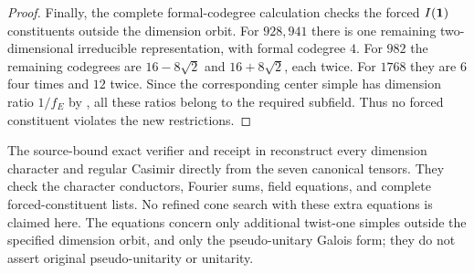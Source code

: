 \begin{proof}
Finally, the complete formal-codegree calculation checks the forced
$ I(\mathbf1)$ constituents outside the dimension orbit.  For $928,941$
there is one remaining two-dimensional irreducible representation,
with formal codegree $4$.  For $982$ the remaining codegrees are
$16-8\sqrt2$ and $16+8\sqrt2$, each twice.  For $1768$ they are
$6$ four times and $12$ twice.  Since the corresponding center simple
has dimension ratio $1/f_E$ by \cite[Theorem~2.13]{OstrikPiv3}, all
these ratios belong to the required subfield.  Thus no forced
constituent violates the new restrictions.
\end{proof}

The source-bound exact verifier  and receipt
 in
reconstruct every dimension character and regular Casimir directly
from the seven canonical tensors.  They check the character conductors,
Fourier sums, field equations, and complete forced-constituent lists.
No refined cone search with these extra equations is claimed here.
The equations concern only additional twist-one simples outside the
specified dimension orbit, and only the pseudo-unitary Galois form;
they do not assert original pseudo-unitarity or unitarity.
